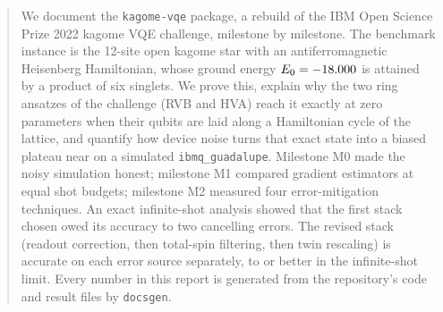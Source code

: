 \documentclass{article}
\begin{document}
\maketitle
\thispagestyle{fancy}

\begin{abstract}
  We document the \texttt{kagome-vqe} package, a rebuild of the IBM Open Science Prize 2022
  kagome VQE challenge, milestone by milestone. The benchmark instance is the 12-site open
  kagome star with an antiferromagnetic Heisenberg Hamiltonian, whose ground energy
  $E_0=\VExactE$ is attained by a product of six singlets. We prove this, explain why the two
  ring ansatzes of the challenge (RVB and HVA) reach it exactly at zero parameters when their
  qubits are laid along a Hamiltonian cycle of the lattice, and quantify how device noise turns
  that exact state into a biased plateau near \VPostFinalMax{} on a simulated
  \texttt{ibmq\_guadalupe}. Milestone M0 made the noisy simulation honest; milestone M1
  compared gradient estimators at equal shot budgets; milestone M2 measured four error-mitigation
  techniques. An exact infinite-shot analysis showed that the first stack chosen owed its
  accuracy to two cancelling errors. The revised stack (readout correction, then total-spin
  filtering, then twin rescaling) is accurate on each error source separately, to
  \VMxTwMax{} or better in the infinite-shot limit. Every number in this report is generated
  from the repository's code and result files by \texttt{docsgen}.
\end{abstract}

\tableofcontents
\newpage










\printbibliography

\appendix

\end{document}
